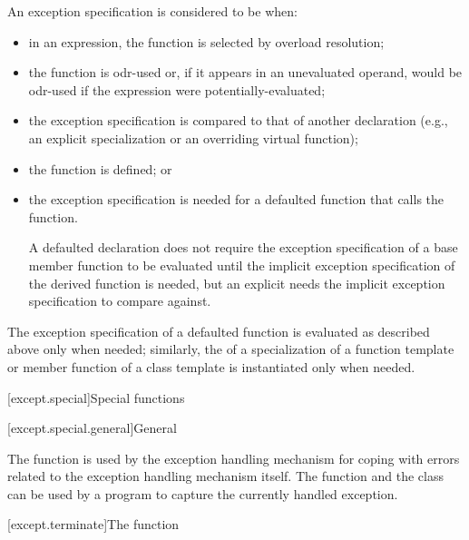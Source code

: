 \pnum
An exception specification is considered to be  when:
\begin{itemize}
\item in an expression, the function is selected by
overload resolution;

\item the function is odr-used or, if it appears in an
unevaluated operand, would be odr-used if the expression were
potentially-evaluated;

\item the exception specification is compared to that of another
declaration (e.g., an explicit specialization or an overriding virtual
function);

\item the function is defined; or

\item the exception specification is needed for a defaulted
function that calls the function.
\begin{note}
A defaulted declaration does not require the
exception specification of a base member function to be evaluated
until the implicit exception specification of the derived
function is needed, but an explicit  needs
the implicit exception specification to compare against.
\end{note}
\end{itemize}
The exception specification of a defaulted
function is evaluated as described above only when needed; similarly, the
 of a specialization of a function
template or member function of a class template is instantiated only when
needed.
%

[except.special]{Special functions}

[except.special.general]{General}

\pnum
The function 
is used by the exception
handling mechanism for coping with errors related to the exception handling
mechanism itself. The function
 and the class
 can be used by a program to
capture the currently handled exception.

[except.terminate]{The  function}

